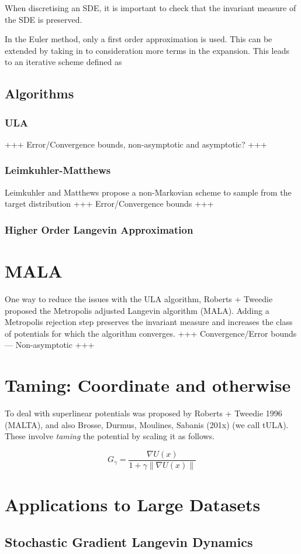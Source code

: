 \documentclass[a4paper]{article}
\theoremstyle{definition}
\begin{document}
		When discretising an SDE, it is important to check that the invariant measure of the SDE is preserved. 
		
		In the Euler method, only a first order approximation is used. This can be extended by taking in to consideration more terms in the expansion. This leads to an iterative scheme defined as
		\subsection{Algorithms}
		\subsubsection{ULA}
		+++ Error/Convergence bounds, non-asymptotic and asymptotic? +++
		\subsubsection{Leimkuhler-Matthews}
		Leimkuhler and Matthews propose a non-Markovian scheme to sample from the target distribution
			+++ Error/Convergence bounds +++
		\subsubsection{Higher Order Langevin Approximation}

	\section{MALA}
	One way to reduce the issues with the ULA algorithm, Roberts + Tweedie proposed the Metropolis adjusted Langevin algorithm (MALA). Adding a Metropolis rejection step preserves the invariant measure and increases the class of potentials for which the algorithm converges.
	+++ Convergence/Error bounds --- Non-asymptotic +++ 
	
	\section{Taming: Coordinate and otherwise}
	
	To deal with superlinear potentials was proposed by Roberts + Tweedie 1996 (MALTA), and also Brosse, Durmus, Moulines, Sabanis (201x) (we call tULA). These involve \emph{taming} the potential by scaling it as follows.
	
	\[G_{\gamma} = \frac{\nabla U(x)}{1+\gamma \|\nabla U(x)\|}\]
	
	
	 
	
	\section{Applications to Large Datasets}
		\subsection{Stochastic Gradient Langevin Dynamics}
\end{document}
